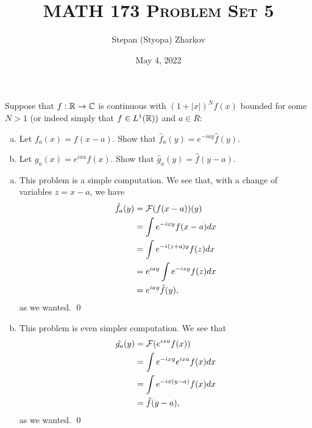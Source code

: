 \documentclass{article}
\title{\textsc{MATH 173 Problem Set 5}}
\author{Stepan (Styopa) Zharkov}
\date{May 4, 2022}
\begin{document}
\maketitle
{} Suppose that $f : \RR \to \CC$ is continuous with $(1 + |x|)^Nf(x)$ bounded for some $N > 1$ (or
indeed simply that $f \in L^1(\RR))$ and $a \in R$:
\begin{enumerate}[(a)]
    \item Let $f_a(x) = f(x - a)$. Show that $\hat{f}_a(y) = e^{-iay} \hat{f}(y)$.
\item Let $g_a(x) = e^{ixa}f(x)$. Show that $\hat{g}_a(y) = \hat{f}(y - a)$. 
\end{enumerate}
 \tri
\hop 
\solution
\begin{enumerate}[(a)]
    \item This problem is a simple computation. We see that, with a change of variables $z = x-a$, we have
    \begin{align*}
        \hat{f_a}(y) &= \cal{F}(f(x-a))(y) \\
        &= \int e^{-ixy}f(x-a)dx \\
        &= \int e^{-i(z+a)y}f(z)dx \\
        &= e^{iay}\int e^{-izy}f(z)dx \\
        &= e^{iay}\hat{f}(y),
    \end{align*}
    as we wanted. \qed
    \item This problem is even simpler computation. We see that 
    \begin{align*}
        \hat{g_a}(y) &= \cal{F}(e^{ixa}f(x))\\
        &= \int e^{-ixy}e^{ixa}f(x)dx \\
        &= \int e^{-ix(y-a)}f(x)dx \\
        &= \hat{f}(y-a),
    \end{align*}
    as we wanted. \qed
\end{enumerate}
\end{document}
